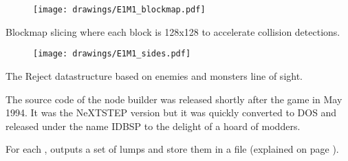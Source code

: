 \begin{figure}[H]
\centering
\texttt{[image: drawings/E1M1\_blockmap.pdf]}
\end{figure}
\par
Blockmap slicing where each block is 128x128 to accelerate collision detections.\\
\par
\begin{figure}[H]
\centering
\texttt{[image: drawings/E1M1\_sides.pdf]}
\end{figure}
\par
The Reject datastructure based on enemies and monsters line of sight.
\pagebreak


The source code of the node builder was released shortly after the game in May 1994. It was the NeXTSTEP version but it was quickly converted to DOS and released under the name IDBSP to the delight of a hoard of modders.\\
\par
{}
\par
For each ,  outputs a set of lumps and store them in a  file (explained on page \pageref{wad_explained}).\\

